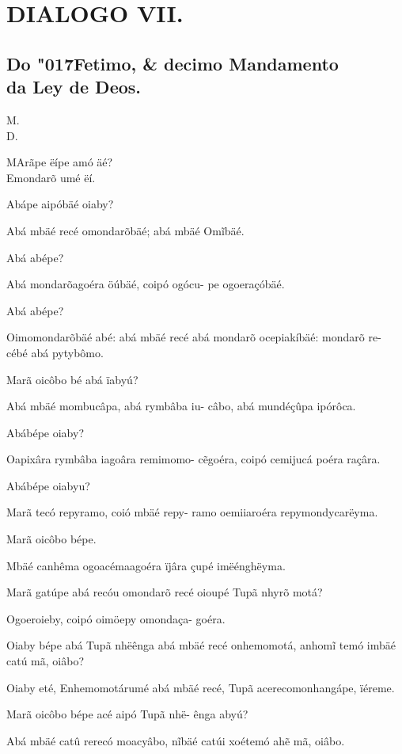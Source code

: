 \documentclass[openany,titlepage,12pt]{book}
\renewcommand{\chaptermark}[1]{\markboth{#1}{}}
\renewcommand{\sectionmark}[1]{\gdef\rightmark{#1}}
\newcommand{\lgS}{\char"017F}
\newcommand{\comecalista}[5]{
    \hspace*{-11.7pt}
    \begin{minipage}[t]{0.08\linewidth}
        \flushright #1\\#2
    \end{minipage}
    \hspace{0pt}
    \begin{minipage}[t]{0.94\linewidth}
        \lettrine
        [findent =2pt, nindent=0pt,  lines=2]
        {#3}{#4}#5
    \end{minipage}
    \vspace*{-3pt}
}
\begin{document}
\section{DIALOGO VII.}
\subsection{Do \lgS etimo, \& decimo Mandamento 
    \\da Ley de Deos.
}

\chaptermark{Dialogo VII.}
\sectionmark{Naõ furtarás, \&c}
\vspace*{9pt}

\comecalista{M.}{D.}{M}{A}
{rãpe ëípe amó äé?\\
    Emondarõ umé ëí.
}

\begin{alternate}
    \item Abápe aipóbäé oiaby?
    \item Abá mbäé recé omondarõbäé; abá mbäé
        Om\~ibäé.
    \item Abá abépe?
    \item Abá mondarõagoéra öúbäé, coipó ogócu-
        pe ogoeraçóbäé.
    \item Abá abépe?
    \item Oimomondarõbäé abé: abá mbäé recé
        abá mondarõ ocepiakíbäé: mondarõ re-
        cébé abá pytybômo.
    \item Marã oicôbo bé abá ïabyú?
    \item Abá mbäé mombucâpa, abá rymbâba iu-
        câbo, abá mundéçûpa ipórôca.
    \item Abábépe oiaby?
    \item Oapixâra rymbâba iagoâra remimomo-
        c\~egoéra, coipó cemijucá poéra raçâra.
    \item Abábépe oiabyu?
    \item Marã tecó repyramo, coió mbäé repy-\linebreak
        ramo oemiiaroéra repymondycarëyma.
    \item Marã oicôbo bépe.
    \item Mbäé canhêma ogoacémaagoéra ïjâra\linebreak
        çupé imëénghëyma.
    \item Marã gatúpe abá recóu omondarõ recé
        oioupé Tupã nhyrõ motá?
    \item Ogoeroieby, coipó oimöepy omondaça-
        goéra.
    \item Oiaby bépe abá Tupã nhëênga abá mbäé
        recé onhemomotá, anhom\~i temó imbäé
        catú mã, oiâbo?
    \item Oiaby eté, Enhemomotárumé abá mbäé
        recé, Tupã acerecomonhangápe, ïéreme.
    \item Marã oicôbo bépe acé aipó Tupã nhë-
        ênga abyú?
    \item Abá mbäé catû rerecó moacyâbo, n\~ibäé
        catúi xoétemó ah\~e mã, oiâbo.
\end{alternate}
\end{document}
